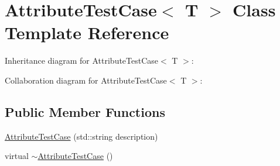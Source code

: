 \hypertarget{classAttributeTestCase}{}\section{Attribute\+Test\+Case$<$ T $>$ Class Template Reference}
\label{classAttributeTestCase}


Inheritance diagram for Attribute\+Test\+Case$<$ T $>$\+:


Collaboration diagram for Attribute\+Test\+Case$<$ T $>$\+:
\subsection*{Public Member Functions}
\begin{DoxyCompactItemize}
\item 
\hyperlink{classAttributeTestCase_a9e5836a319d4bddc583ad943a1fc8b9d}{Attribute\+Test\+Case} (std\+::string description)
\item 
virtual \hyperlink{classAttributeTestCase_a93811782ad061aef14c3207e8e8d6a33}{$\sim$\+Attribute\+Test\+Case} ()
\end{DoxyCompactItemize}
